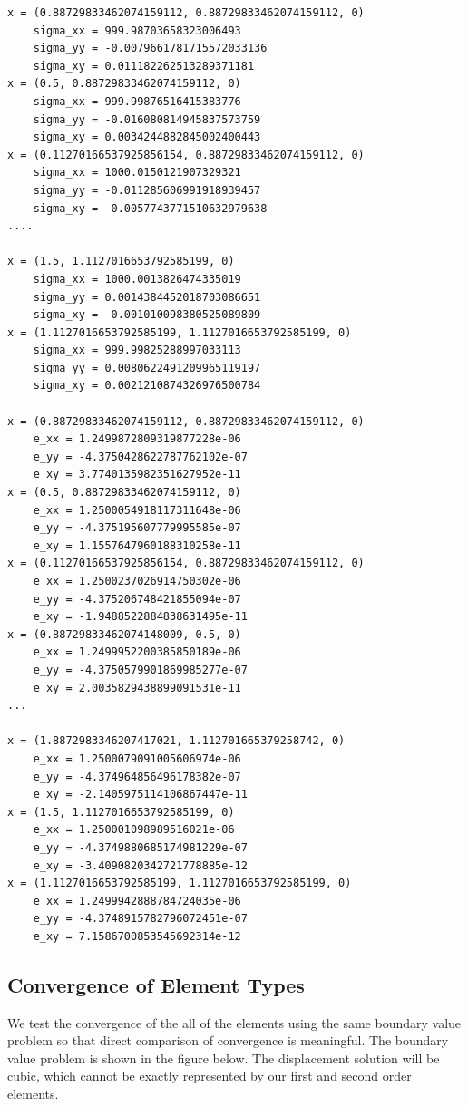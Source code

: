 \documentclass{article}
\begin{document}
\begin{lstlisting}[frame = single]
x = (0.88729833462074159112, 0.88729833462074159112, 0)
    sigma_xx = 999.98703658323006493
    sigma_yy = -0.0079661781715572033136
    sigma_xy = 0.011182262513289371181
x = (0.5, 0.88729833462074159112, 0)
    sigma_xx = 999.99876516415383776
    sigma_yy = -0.016080814945837573759
    sigma_xy = 0.0034244882845002400443
x = (0.11270166537925856154, 0.88729833462074159112, 0)
    sigma_xx = 1000.0150121907329321
    sigma_yy = -0.011285606991918939457
    sigma_xy = -0.0057743771510632979638
....

x = (1.5, 1.1127016653792585199, 0)
    sigma_xx = 1000.0013826474335019
    sigma_yy = 0.0014384452018703086651
    sigma_xy = -0.001010098380525089809
x = (1.1127016653792585199, 1.1127016653792585199, 0)
    sigma_xx = 999.99825288997033113
    sigma_yy = 0.0080622491209965119197
    sigma_xy = 0.0021210874326976500784

x = (0.88729833462074159112, 0.88729833462074159112, 0)
    e_xx = 1.2499872809319877228e-06
    e_yy = -4.3750428622787762102e-07
    e_xy = 3.7740135982351627952e-11
x = (0.5, 0.88729833462074159112, 0)
    e_xx = 1.2500054918117311648e-06
    e_yy = -4.375195607779995585e-07
    e_xy = 1.1557647960188310258e-11
x = (0.11270166537925856154, 0.88729833462074159112, 0)
    e_xx = 1.2500237026914750302e-06
    e_yy = -4.375206748421855094e-07
    e_xy = -1.9488522884838631495e-11
x = (0.88729833462074148009, 0.5, 0)
    e_xx = 1.2499952200385850189e-06
    e_yy = -4.3750579901869985277e-07
    e_xy = 2.0035829438899091531e-11
...

x = (1.8872983346207417021, 1.112701665379258742, 0)
    e_xx = 1.2500079091005606974e-06
    e_yy = -4.374964856496178382e-07
    e_xy = -2.1405975114106867447e-11
x = (1.5, 1.1127016653792585199, 0)
    e_xx = 1.250001098989516021e-06
    e_yy = -4.3749880685174981229e-07
    e_xy = -3.4090820342721778885e-12
x = (1.1127016653792585199, 1.1127016653792585199, 0)
    e_xx = 1.2499942888784724035e-06
    e_yy = -4.3748915782796072451e-07
    e_xy = 7.1586700853545692314e-12
\end{lstlisting}

\subsection{Convergence of Element Types}
\FloatBarrier
We test the convergence of the all of the elements using the same boundary value problem so that direct comparison of convergence is meaningful. The boundary value problem is shown in the figure below. The displacement solution will be cubic, which cannot be exactly represented by our first and second order elements. 
\end{document}
